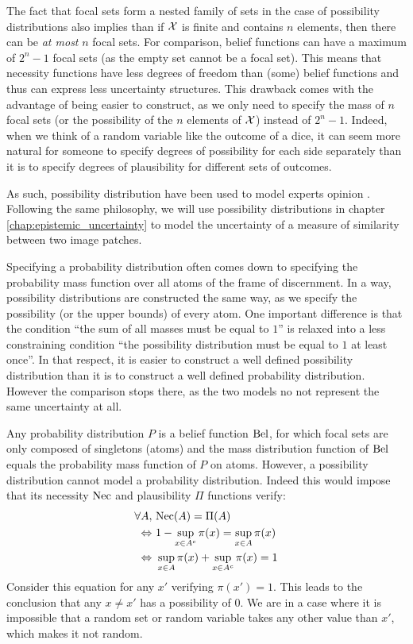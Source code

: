 \begin{remark}
    The fact that focal sets form a nested family of sets in the case of possibility distributions also implies than if ${\mathcal{X}}$ is finite and contains $n$ elements, then there can be \textit{at most} $n$ focal sets. For comparison, belief functions can have a maximum of $2^n-1$ focal sets (as the empty set cannot be a focal set). This means that necessity functions have less degrees of freedom than (some) belief functions and thus can express less uncertainty structures. This drawback comes with the advantage of being easier to construct, as we only need to specify the mass of $n$ focal sets (or the possibility of the $n$ elements of ${\mathcal{X}}$) instead of $2^n-1$. Indeed, when we think of a random variable like the outcome of a dice, it can seem more natural for someone to specify degrees of possibility for each side separately than it is to specify degrees of plausibility for different sets of outcomes. 
    
    As such, possibility distribution have been used to model experts opinion  \cite{baudrit_joint_2007}. Following the same philosophy, we will use possibility distributions in chapter \ref{chap:epistemic_uncertainty} to model the uncertainty of a measure of similarity between two image patches.
\end{remark}

Specifying a probability distribution often comes down to specifying the probability mass function over all atoms of the frame of discernment. In a way, possibility distributions are constructed the same way, as we specify the possibility (or the upper bounds) of every atom. One important difference is that the condition ``the sum of all masses must be equal to $1$'' is relaxed into a less constraining condition ``the possibility distribution must be equal to $1$ at least once''. In that respect, it is easier to construct a well defined possibility distribution than it is to construct a well defined probability distribution. However the comparison stops there, as the two models no not represent the same uncertainty at all.

\begin{remark}
    Any probability distribution $P$ is a belief function ${\mathrm{Bel}}$, for which focal sets are only composed of singletons (atoms) and the mass distribution function of ${\mathrm{Bel}}$ equals the probability mass function of $P$ on atoms. However, a possibility distribution cannot model a probability distribution. Indeed this would impose that its necessity ${\mathrm{Nec}}$ and plausibility $\Pi$ functions verify:
    \begin{align*}
        \forall A, &~{\mathrm{Nec}}(A) = \Pi(A)\\
        \Leftrightarrow&~1-\sup_{x\in A^c}\pi(x) = \sup_{x\in A}\pi(x)\\
        \Leftrightarrow&~ \sup_{x\in A}\pi(x) + \sup_{x\in A^c}\pi(x) = 1
    \end{align*}
    Consider this equation for any $x'$ verifying $\pi(x')=1$. This leads to the conclusion that any $x\neq x'$ has a possibility of $0$. We are in a case where it is impossible that a random set or random variable takes any other value than $x'$, which makes it not random. 
\end{remark}

